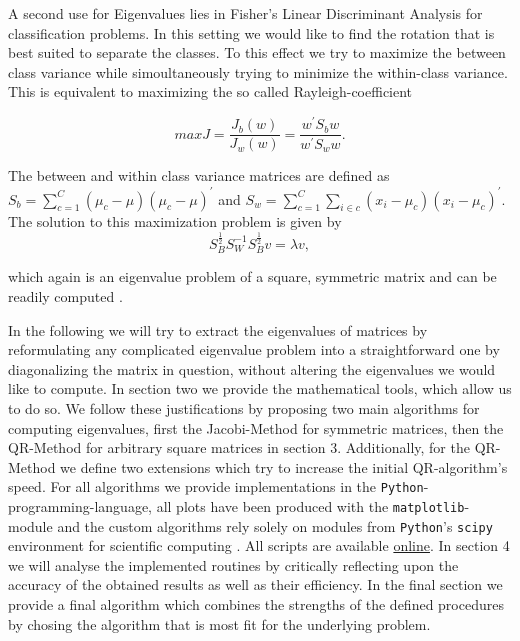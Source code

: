 \documentclass[12pt]{article}
\begin{document}
A second use for Eigenvalues lies in Fisher's Linear Discriminant Analysis for classification problems. In this setting we would like to find the rotation that is best suited to separate the classes. To this effect we try to maximize the between class variance while simoultaneously trying to minimize the within-class variance. This is equivalent to maximizing the so called Rayleigh-coefficient

\begin{equation}
\label{LDA}
max J = \frac{J_b(w)}{J_w(w)} = \frac{w^{\prime} S_{b} w}{w^{\prime} S_{w} w}.
\end{equation}

The between and within class variance matrices are defined as $S_b = \sum\limits_{c=1}^{C}(\mu_c - \mu)(\mu_c - \mu)^{\prime}$ and $S_w = \sum\limits_{c=1}^{C}\sum\limits_{i \in c}(x_i - \mu_c)(x_i - \mu_c)^{\prime}$. The solution to this maximization problem is given by
\begin{equation}
S_B^{\frac{1}{2}} S_W^{-1} S_B^{\frac{1}{2}} v = \lambda v,
\end{equation}

which again is an eigenvalue problem of a square, symmetric matrix and can be readily computed \citep[p. 219]{duda}.

In the following we will try to extract the eigenvalues of matrices by reformulating any complicated eigenvalue problem into a straightforward one by diagonalizing the matrix in question, without altering the eigenvalues we would like to compute. In section two we provide the mathematical tools, which allow us to do so. We follow these justifications by proposing two main algorithms for computing eigenvalues, first the Jacobi-Method for symmetric matrices, then the QR-Method for arbitrary square matrices in section 3. Additionally, for the QR-Method we define two extensions which try to increase the initial QR-algorithm's speed.
For all algorithms we provide implementations in the \texttt{Python}-programming-language, all plots have been produced with the \texttt{matplotlib}-module and the custom algorithms rely solely on modules from \texttt{Python}'s \texttt{scipy} environment for scientific computing \citep{python, matplotlib, scipy}. All scripts are available \href{https://github.com/thsis/NIS18}{online}. In section 4 we will analyse the implemented routines by critically reflecting upon the accuracy of the obtained results as well as their efficiency. In the final section we provide a final algorithm which combines the strengths of the defined procedures by chosing the algorithm that is most fit for the underlying problem.
\end{document}
